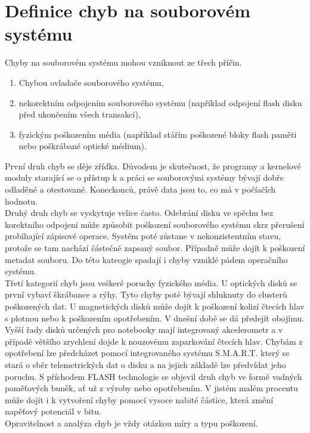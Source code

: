 \chapter{Definice chyb na souborovém systému}
Chyby na souborovém systému mohou vzniknout ze třech příčin. 
\begin{enumerate}
    \item Chybou ovladače souborového systému,
    \item nekorektním odpojením souborového systému (například odpojení flash disku před ukončením všech transakcí),
    \item fyzickým poškozením média (například stářím poškozené bloky flash paměti nebo poškrábané optické médium).
\end{enumerate}
První druh chyb se děje zřídka. Důvodem je skutečnost, že programy a kernelové moduly starající se o přístup k a práci se souborovými systémy bývají dobře odladěné a otestované. Koneckonců, právě data jsou to, co má v počíačích hodnotu.\\
Druhý druh chyb se vyskytuje velice často. Odebrání disku ve spěchu bez korektního odpojení může způsobit poškození souborového systému skrz přerušení probíhající zápisové operace. Systém poté zůstane v nekonzistentním stavu, protože se tam nachází částečně zapsaný soubor. Případně může dojít k poškození metadat souboru. Do této kateogie spadají i chyby vzniklé pádem operačního systému.\\
Třetí kategorií chyb jsou veškeré poruchy fyzického média. U optických disků se první vybaví škrábance a rýhy. Tyto chyby poté bývají shluknuty do clusterů poškozených dat. U magnetických disků může dojít k poškození kolizí čtecích hlav s plotnou nebo k poškozením opotřebením. V dnešní době se dá předejít obojímu. Vyšší řady disků určených pro notebooky mají integrovaný akcelerometr a v případě většího zrychlení dojde k nouzovému zaparkování čtecích hlav. Chybám z opotřebení lze předcházet pomocí integrovaného systému S.M.A.R.T. který se stará o sběr telemetrických dat o disku a na jejich základě lze předvídat jeho poruchu. S příchodem FLASH technologie se objevil druh chyb ve formě vadných paměťových buněk, ať už z výroby nebo opotřebením. V jistém malém procentu může dojít i k vytvoření chyby pomocí vysoce nabité částice, která změní napěťový potenciál v bitu.\\
Opravitelnost a analýza chyb je vždy otázkou míry a typu poškození.

